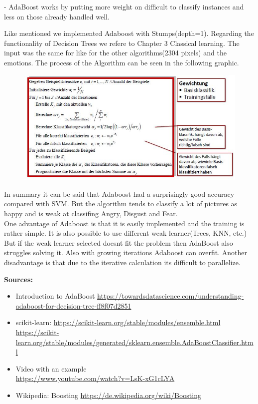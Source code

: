 - AdaBoost works by putting more weight on difficult to classify instances and less on those already handled well.

Like mentioned we implemented Adaboost with Stumps(depth=1). Regarding the functionality of Decision Trees we refere to Chapter 3 Classical learning. The input was the same for like for the other algorithms(2304 pixels) and the emotions. The process of the Algorithm can be seen in the following graphic. 
\begin{figure}[hbtp]
	\centering
\includegraphics[scale=0.8]{Images/Adaboost_1.png} \\
\end{figure}

In summary it can be said that Adaboost had a surprisingly good accuracy compared with SVM. But the algorithm tends to classify a lot of pictures as happy and is weak at classifing Angry, Disgust and Fear.\\
One advantage of Adaboost is that it is easily implemented and the training is rather simple. It is also possible to use different weak learner(Trees, KNN, etc.) But if the weak learner selected doesnt fit the problem then AdaBoost also struggles solving it. Also with growing iterations Adaboost can overfit. Another disadvantage is that due to the iterative calculation its difficult to parallelize.

\textbf{Sources:}
\begin{itemize}
\item Introduction to AdaBoost \hyperlink{https://towardsdatascience.com/understanding-adaboost-for-decision-tree-ff8f07d2851}{https://towardsdatascience.com/understanding-adaboost-for-decision-tree-ff8f07d2851}
\item scikit-learn: \hyperlink{https://scikit-learn.org/stable/modules/ensemble.html}{https://scikit-learn.org/stable/modules/ensemble.html} \\
\hyperlink{https://scikit-learn.org/stable/modules/generated/sklearn.ensemble.AdaBoostClassifier.html}{https://scikit-learn.org/stable/modules/generated/sklearn.ensemble.AdaBoostClassifier.html}
\item Video with an example \\ \hyperlink{https://www.youtube.com/watch?v=LsK-xG1cLYA}{https://www.youtube.com/watch?v=LsK-xG1cLYA}
\item Wikipedia: Boosting \hyperlink{https://de.wikipedia.org/wiki/Boosting}{https://de.wikipedia.org/wiki/Boosting}
\end{itemize}



\newpage